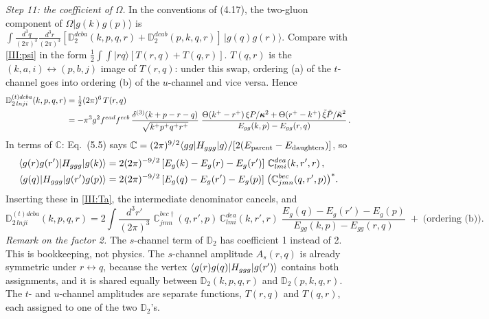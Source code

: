\emph{Step 11: the coefficient of Ω.} In the conventions of (4.17), the two-gluon component of $\Omega|g(k)g(p)\rangle$ is $\int\frac{d^3q}{(2\pi)^3}\frac{d^3r}{(2\pi)^3}[\mathbb D_2^{dcba}(k,p,q,r)+\mathbb D_2^{dcab}(p,k,q,r)]\,|g(q)g(r)\rangle$. Compare with \eqref{III:psi} in the form $\frac12\int\!\int|rq\rangle[T(r,q)+T(q,r)]$. $T(q,r)$ is the $(k,a,i)\leftrightarrow(p,b,j)$ image of $T(r,q)$: under this swap, ordering (a) of the $t$-channel goes into ordering (b) of the $u$-channel and vice versa. Hence
\begin{align}
\mathbb D^{(t)dcba}_{2\,lnji}(k,p,q,r)&=\tfrac12(2\pi)^6\,T(r,q)\nonumber\\
&=-\pi^3g^2f^{ead}f^{ecb}\,\frac{\delta^{(3)}(k+p-r-q)}{\sqrt{k^+p^+q^+r^+}}\;
\frac{\Theta(k^+-r^+)\,\xi P/\boldsymbol\kappa^2+\Theta(r^+-k^+)\,\tilde\xi\tilde P/\tilde{\boldsymbol\kappa}^2}{E_{gg}(k,p)-E_{gg}(r,q)}\,.
\label{III:D2}
\end{align}
In terms of $\mathbb C$: Eq.~(5.5) says $\mathbb C=(2\pi)^{9/2}\langle gg|H_{ggg}|g\rangle/[2(E_{\rm parent}-E_{\rm daughters})]$, so
\begin{align*}
\langle g(r)g(r')|H_{ggg}|g(k)\rangle&=2(2\pi)^{-9/2}\,[E_g(k)-E_g(r)-E_g(r')]\;\mathbb C^{dea}_{lmi}(k,r',r)\,,\\
\langle g(q)|H_{ggg}|g(r')g(p)\rangle&=2(2\pi)^{-9/2}\,[E_g(q)-E_g(r')-E_g(p)]\;\big(\mathbb C^{bec}_{jmn}(q,r',p)\big)^*.
\end{align*}
Inserting these in \eqref{III:Ta}, the intermediate denominator cancels, and
\begin{equation}
\mathbb D^{(t)dcba}_{2\,lnji}(k,p,q,r)=2\int\!\frac{d^3r'}{(2\pi)^3}\;\mathbb C^{bec\dagger}_{jmn}(q,r',p)\,\mathbb C^{dea}_{lmi}(k,r',r)\;\frac{E_g(q)-E_g(r')-E_g(p)}{E_{gg}(k,p)-E_{gg}(r,q)}\;+\;\text{(ordering (b))}.
\label{III:D2C}
\end{equation}
\emph{Remark on the factor 2.} The $s$-channel term of $\mathbb D_2$ has coefficient 1 instead of 2. This is bookkeeping, not physics. The $s$-channel amplitude $A_s(r,q)$ is already symmetric under $r\leftrightarrow q$, because the vertex $\langle g(r)g(q)|H_{ggg}|g(r')\rangle$ contains both assignments, and it is shared equally between $\mathbb D_2(k,p,q,r)$ and $\mathbb D_2(p,k,q,r)$. The $t$- and $u$-channel amplitudes are separate functions, $T(r,q)$ and $T(q,r)$, each assigned to one of the two $\mathbb D_2$'s.


